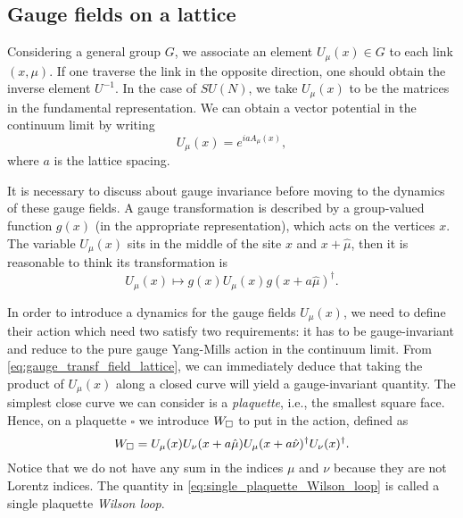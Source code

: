 %
%
\subsection{Gauge fields on a lattice}
\label{sub:gauge_fields_on_a_lattice}

Considering a general group $G$, we associate an element $U_{\mu}(x) \in G$ to each link $(x, \mu)$.
If one traverse the link in the opposite direction, one should obtain the inverse element $U^{-1}$.
In the case of $SU(N)$, we take $U_{\mu}(x)$ to be the matrices in the fundamental representation.
We can obtain a vector potential in the continuum limit by writing
\begin{equation}
    U_{\mu}(x) = e^{i a A_{\mu}(x)},
\end{equation}
where $a$ is the lattice spacing.

It is necessary to discuss about gauge invariance before moving to the dynamics of these gauge fields.
A gauge transformation is described by a group-valued function $g(x)$ (in the appropriate representation), which acts on the vertices $x$.
The variable $U_{\mu}(x)$ sits in the middle of the site $x$ and $x + \hat{\mu}$, then it is reasonable to think its transformation is
\begin{equation}
    U_{\mu}(x) \mapsto g(x) U_{\mu}(x) g(x + a \hat{\mu})^{\dagger}
    \label{eq:gauge_transf_field_lattice}.
\end{equation}

In order to introduce a dynamics for the gauge fields $U_{\mu}(x)$, we need to define their action which need two satisfy two requirements:
it has to be gauge-invariant and reduce to the pure gauge Yang-Mills action in the continuum limit.
From \eqref{eq:gauge_transf_field_lattice}, we can immediately deduce that taking the product of $U_{\mu}(x)$ along a closed curve will yield a gauge-invariant quantity.
The simplest close curve we can consider is a \emph{plaquette}, i.e., the smallest square face.
Hence, on a plaquette $\square$ we introduce $W_{\square}$ to put in the action, defined as
\begin{equation}
    W_{\square} =
    U_{\mu}(x) U_{\nu}(x + a \hat{\mu}) U_{\mu}(x + a \hat{\nu})^{\dagger} U_{\nu}(x)^{\dagger}.
    \label{eq:single_plaquette_Wilson_loop}
\end{equation}
Notice that we do not have any sum in the indices $\mu$ and $\nu$ because they are not Lorentz indices.
The quantity in \eqref{eq:single_plaquette_Wilson_loop} is called a single plaquette \emph{Wilson loop}.

